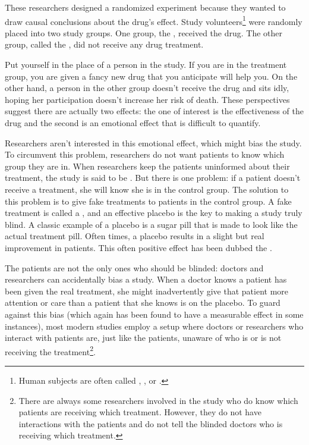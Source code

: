 These researchers designed a randomized experiment because they wanted to draw causal conclusions about the drug's effect. Study volunteers\footnote{Human subjects are often called , , or .} were randomly placed into two study groups. One group, the , received the drug. The other group, called the , did not receive any drug treatment.

Put yourself in the place of a person in the study. If you are in the treatment group, you are given a fancy new drug that you anticipate will help you. On the other hand, a person in the other group doesn't receive the drug and sits idly, hoping her participation doesn't increase her risk of death. These perspectives suggest there are actually two effects: the one of interest is the effectiveness of the drug and the second is an emotional effect that is difficult to quantify.

Researchers aren't interested in this emotional effect, which might bias the study. To circumvent this problem, researchers do not want patients to know which group they are in. When researchers keep the patients uninformed about their treatment, the study is said to be . But there is one problem: if a patient doesn't receive a treatment, she will know she is in the control group. The solution to this problem is to give fake treatments to patients in the control group. A fake treatment is called a , and an effective placebo is the key to making a study truly blind. A classic example of a placebo is a sugar pill that is made to look like the actual treatment pill. Often times, a placebo results in a slight but real improvement in patients. This often positive effect has been dubbed the .

The patients are not the only ones who should be blinded: doctors and researchers can accidentally bias a study. When a doctor knows a patient has been given the real treatment, she might inadvertently give that patient more attention or care than a patient that she knows is on the placebo. To guard against this bias (which again has been found to have a measurable effect in some instances), most modern studies employ a  setup where doctors or researchers who interact with patients are, just like the patients, unaware of who is or is not receiving the treatment\footnote{There are always some researchers involved in the study who do know which patients are receiving which treatment. However, they do not have interactions with the patients and do not tell the blinded doctors who is receiving which treatment.}.

